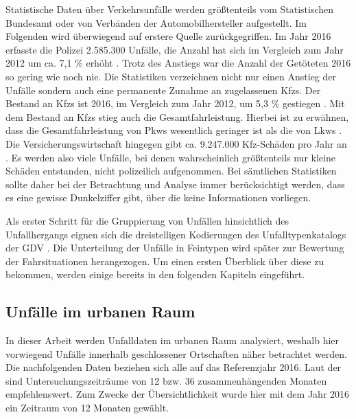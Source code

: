 Statistische Daten über Verkehrsunfälle werden größtenteils vom Statistischen Bundesamt oder von Verbänden der Automobilhersteller aufgestellt. Im Folgenden wird überwiegend auf erstere Quelle zurückgegriffen. Im Jahr 2016 erfasste die Polizei 2.585.300 Unfälle, die Anzahl hat sich im Vergleich zum Jahr 2012 um ca. 7,1 \% erhöht \parencite[S. 5]{StatistischesBundesamt.2018}. Trotz des Anstiegs war die Anzahl der Getöteten 2016 so gering wie noch nie. Die Statistiken verzeichnen nicht nur einen Anstieg der Unfälle sondern auch eine permanente Zunahme an zugelassenen \acp{Kfz}. Der Bestand an \acp{Kfz} ist 2016, im Vergleich zum Jahr 2012, um 5,3 \% gestiegen \parencite[S. 5]{StatistischesBundesamt.2018}. Mit dem Bestand an \aclp{Kfz} stieg auch die Gesamtfahrleistung. Hierbei ist zu erwähnen, dass die Gesamtfahrleistung von Pkws wesentlich geringer ist als die von Lkws \parencite[S. 150]{BundesministeriumfurVerkehrunddigitaleInfrastruktur.2017}. Die Versicherungswirtschaft hingegen gibt ca. 9.247.000 \acs{Kfz}-Schäden pro Jahr an \parencite[S. 27]{Burg.2017}. Es werden also viele Unfälle, bei denen wahrscheinlich größtenteils nur kleine Schäden entstanden, nicht polizeilich aufgenommen. Bei sämtlichen Statistiken sollte daher bei der Betrachtung und Analyse immer berücksichtigt werden, dass es eine gewisse Dunkelziffer gibt, über die keine Informationen vorliegen.

Als erster Schritt für die Gruppierung von Unfällen hinsichtlich des Unfallhergangs eignen sich die dreistelligen Kodierungen des Unfalltypenkatalogs der \ac{GDV} \parencite[S. 18]{Vollrath.2006}. Die Unterteilung der Unfälle in Feintypen wird später zur Bewertung der Fahrsituationen herangezogen. Um einen ersten Überblick über diese zu bekommen, werden einige bereits in den folgenden Kapiteln eingeführt.

\subsection{Unfälle im urbanen Raum}
In dieser Arbeit werden Unfalldaten im urbanen Raum analysiert, weshalb hier vorwiegend Unfälle innerhalb geschlossener Ortschaften näher betrachtet werden. Die nachfolgenden Daten beziehen sich alle auf das Referenzjahr 2016. Laut der \Textcite[S. 11]{ForschungsgesellschaftfurStraenundVerkehrswesen.2012} sind Untersuchungszeiträume von 12 bzw. 36 zusammenhängenden Monaten empfehlenswert. Zum Zwecke der Übersichtlichkeit wurde hier mit dem Jahr 2016 ein Zeitraum von 12 Monaten gewählt.

